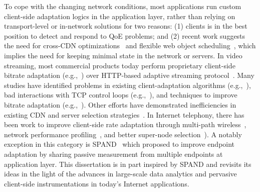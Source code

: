 To cope with the changing network conditions, 
most applications run custom client-side adaptation logics in
the application layer, rather than relying on transport-level or 
in-network solutions for two reasons:
(1) clients is in the best position to detect and respond to 
QoE problems; and 
(2) recent work suggests the need for cross-CDN 
optimizations~\cite{sigcomm12conviva} and 
flexible web object scheduling~\cite{butkiewicz2015klotski},
which implies the need for keeping minimal state in the
network or servers.
In video streaming, most commercial products 
today perform proprietary client-side bitrate adaptation 
(e.g.,~\cite{SmoothStreaming,akamaihd,hls,netflix}) 
over HTTP-based adaptive streaming 
protocol~\cite{dash}.
Many studies have identified problems in existing
client-adaptation algorithms 
(e.g.,~\cite{mmsys2011cisco,de2010experimental}),
bad interactions with TCP control loops
(e.g.,~\cite{confused,usenix12_ghobadi}),
and techniques to improve bitrate adaptation 
(e.g.,~\cite{nossdav12_akhshabi,festive,panda}). 
Other efforts have demonstrated inefficiencies in existing 
CDN and server selection
strategies~\cite{youtubecdn,youtube-infra,sigcomm12,sigcomm12cdnmulti}.
In Internet telephony, there has been work to improve 
client-side rate adaptation through multi-path wireless~\cite{diversifi},
network performance profiling~\cite{sprout,de2008skype}, and 
better super-node selection~\cite{baset2004analysis,Skype-GI08}).
A notably exception in this category is SPAND~\cite{spand}
which proposed to improve endpoint adaptation
by sharing passive measurement from multiple endpoints 
at application layer.
This dissertation is in part inspired by SPAND and revisits
its ideas in the light of the advances in large-scale data analytics
and pervasive client-side instrumentations in today's Internet 
applications.


